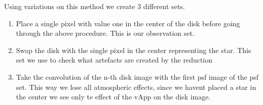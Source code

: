 Using variations on this method we create 3 different sets.

\begin{enumerate}
\item Place a single pixel with value one in the center of the disk before going through the above procedure. This is our observation set.
\item Swap the disk with the single pixel in the center representing the star. This set we use to check what artefacts are created by the reduction 
\item Take the convolution of the n-th disk image with the first psf image of the psf set. This way we lose all atmospheric effects, since we havent placed a star in the center we see only te effect of the vApp on the disk image. 
\end{enumerate}

